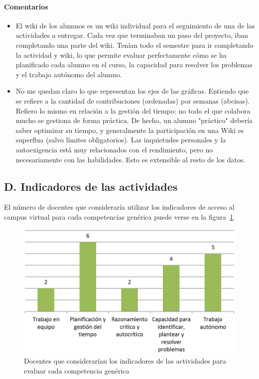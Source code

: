 \paragraph*{Comentarios}

\begin{itemize}
\item El wiki de los alumnos es un wiki individual para el seguimiento de una de las actividades a entregar. Cada vez que terminaban un paso del proyecto, iban completando una parte del wiki. Tenían todo el semestre para ir completando la actividad y wiki, lo que permite evaluar perfectamente cómo se ha planificado cada alumno en el curso, la capacidad para resolver los problemas y el trabajo autónomo del alumno.
\item No me quedan claro lo que representan los ejes de las gráficas. Entiendo que se refiere a la cantidad de contribuciones (ordenadas) por semanas (abcisas). Refiero lo mismo en relación a la gestión del tiempo: no todo el que colabora mucho se gestiona de forma práctica. De hecho, un alumno "práctico" debería saber optimizar su tiempo, y generalmente la participación en una Wiki es superflua (salvo límites obligatorios). Las inquietudes personales y la autoexigencia está muy relacionados con el rendimiento, pero no necesariamente con las habilidades. Esto es extensible al resto de los datos.
\end{itemize}

	\subsection*{D. Indicadores de las actividades}

El número de docentes que consideraría utilizar los indicadores de acceso al campus virtual para cada competencias genérica puede verse en la figura~\ref{fig:ape:aa:actividades}.

\begin{figure}[ht]
    \includegraphics[scale=0.4]{aa-actividades.png}
  \caption{Docentes que considerarían los indicadores de las actividades para evaluar cada competencia genérica}
  \label{fig:ape:aa:actividades}
\end{figure}

